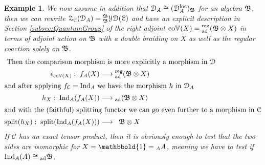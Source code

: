 \documentclass[a4paper, reqno]{amsart}
\newtheorem{example}[theorem]{Example}
\theoremstyle{introTheorems}
\newcommand\cC{\mathcal{C}}
\newcommand\cZ{\mathcal{Z}}
\newcommand{\Ind}{\textup{Ind}}
\newcommand\loc{\textup{loc}}
\renewcommand{\1}{\mathbbold{1}}
\begin{document}
\begin{example}\label{exm:SchauenburgSplit}
We now assume in addition that $\catD_A\cong (\catD_A^\loc)_\NicholsOf$ for an algebra $\mathfrak{B}$, then we can rewrite $\cZ_\catC(\catD_A)=\YD{\NicholsOf}(\catC)$ and have an explicit description  in Section \ref{subsec:QuantumGroup} of the right adjoint $\mathrm{co}\mathbb{V}(X)={_{\text{ad}}^{\text{reg}}}(\mathfrak{B}\otimes X)$ in terms of adjoint action on $\mathfrak{B}$ with a double braiding on $X$ as well as the regular coaction solely on $\mathfrak{B}$. 
\begin{align*}
\intertext{
Then the comparison morphism is more explicitly a morphism in $\catD$}
\epsilon_{\coLaugwitz(X)}:\;
\forget_A(X)
&\longrightarrow
{_{\text{ad}}^{\text{reg}}}(\NicholsOf\otimes X)
\\
\intertext{and after applying $\forget_\comonC=\Ind_A$ we have the morphism $h$ in $\catD_A$}
h_X:\;
\Ind_A(\forget_A(X))
&\longrightarrow
{_{\text{ad}}}(\NicholsOf\otimes X)
\\
\intertext{and with the (faithful) splitting functor we can go even further to a morphism in  $\catC$}
\mathrm{split}(h_X):\;
\mathrm{split}(\Ind_A(\forget_A(X)))
&\longrightarrow
\;\;\NicholsOf\otimes X
\end{align*}
If $\cC$ has an exact tensor product, then it is obviously enough to test that the two sides are isomorphic for $X=\1={_A}A$, meaning we have to  test if $\Ind_A(A)\cong {_{\text{ad}}}\NicholsOf$.
\end{example}
\end{document}
